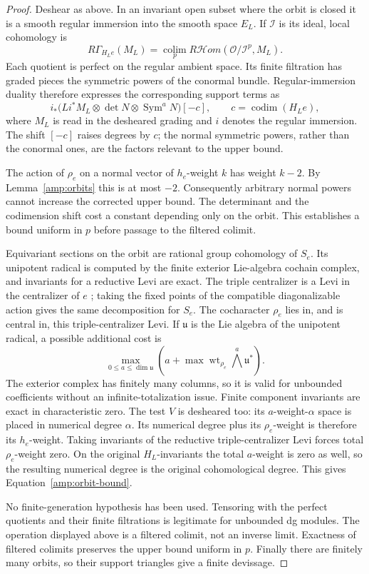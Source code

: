 \begin{proof}
Deshear as above.  In an invariant open subset where the orbit is
closed it is a smooth regular immersion into the smooth space
$E_L$.  If $\mathcal I$ is its ideal, local cohomology is
\[
 R\Gamma_{H_Le}(M_L)
 =\operatorname*{colim}_{p}
 R\mathcal Hom(\mathcal O/\mathcal I^p,M_L).
\]
Each quotient is perfect on the regular ambient space.
Its finite filtration has graded pieces the symmetric powers of
the conormal bundle.  Regular-immersion duality therefore expresses
the corresponding support terms as
\[
 i_*\bigl(Li^*M_L\otimes\det N\otimes
                      \operatorname{Sym}^{a}N\bigr)[-c],
 \qquad c=\operatorname{codim}(H_Le),
\]
where $M_L$ is read in the desheared grading and $i$ denotes the
regular immersion.  The shift $[-c]$ raises degrees by $c$;
the normal symmetric powers, rather than the conormal ones, are
the factors relevant to the upper bound.

The action of $\rho_e$ on a normal vector of $h_e$-weight $k$
has weight $k-2$.  By Lemma~\ref{amp:orbits} this is at most $-2$.
Consequently arbitrary normal powers cannot increase the corrected
upper bound.  The determinant and the codimension shift cost a
constant depending only on the orbit.  This establishes a bound
uniform in $p$ before passage to the filtered colimit.

Equivariant sections on the orbit are rational group cohomology
of $S_e$.  Its unipotent radical is computed by the finite exterior
Lie-algebra cochain complex, and invariants for a reductive Levi
are exact.  The triple centralizer is a Levi in the centralizer
of $e$ \cite[Proposition~3.3]{BMYJM}; taking the fixed points of
the compatible diagonalizable action gives the same decomposition
for $S_e$.  The cocharacter $\rho_e$ lies in, and is central in,
this triple-centralizer Levi.  If $\mathfrak u$ is the Lie algebra
of the unipotent radical, a possible additional cost is
\[
 \max_{0\leq a\leq\dim\mathfrak u}
 \left(a+\max\operatorname{wt}_{\rho_e}
                          \bigwedge^a\mathfrak u^*\right).
\]
The exterior complex has finitely many columns, so it is valid
for unbounded coefficients without an infinite-totalization issue.
Finite component invariants are exact in characteristic zero.
The test $V$ is desheared too: its $a$-weight-$\alpha$ space
is placed in numerical degree $\alpha$.  Its numerical degree
plus its $\rho_e$-weight is therefore its $h_e$-weight.
Taking invariants of the reductive triple-centralizer Levi forces
total $\rho_e$-weight zero.  On the original $H_L$-invariants
the total $a$-weight is zero as well, so the resulting numerical
degree is the original cohomological degree.
This gives Equation~\eqref{amp:orbit-bound}.

No finite-generation hypothesis has been used.  Tensoring with the
perfect quotients and their finite filtrations is legitimate for
unbounded dg modules.  The operation displayed above is a filtered
colimit, not an inverse limit.  Exactness of filtered colimits
preserves the upper bound uniform in $p$.  Finally there are
finitely many orbits, so their support triangles give a finite
devissage.
\end{proof}

